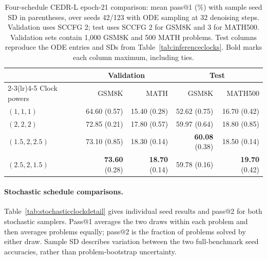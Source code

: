 \documentclass[11pt,letterpaper]{article}
\begin{document}
\begin{table}[htbp]
\centering\small
\caption{Four-schedule CEDR-L epoch-21 comparison: mean pass@1 (\%) with sample seed SD in parentheses, over seeds 42/123 with ODE sampling at 32 denoising steps. Validation uses SCCFG 2; test uses SCCFG 2 for GSM8K and 3 for MATH500. Validation sets contain 1,000 GSM8K and 500 MATH problems. Test columns reproduce the ODE entries and SDs from Table~\ref{tab:inferenceclocks}. Bold marks each column maximum, including ties.}
\label{tab:inferenceclockfull}
\begin{tabular}{lrrrr}
\toprule
& \multicolumn{2}{c}{Validation} & \multicolumn{2}{c}{Test} \\
\cmidrule(lr){2-3}\cmidrule(lr){4-5}
Clock powers & GSM8K & MATH & GSM8K & MATH500 \\
\midrule
$(1,1,1)$ & 64.60 {\scriptsize (0.57)} & 15.40 {\scriptsize (0.28)} & 52.62 {\scriptsize (0.75)} & 16.70 {\scriptsize (0.42)} \\
$(2,2,2)$ & 72.85 {\scriptsize (0.21)} & 17.80 {\scriptsize (0.57)} & 59.97 {\scriptsize (0.64)} & 18.80 {\scriptsize (0.85)} \\
$(1.5,2,2.5)$ & 73.10 {\scriptsize (0.85)} & 18.30 {\scriptsize (0.14)} & \textbf{60.08} {\scriptsize (0.38)} & 18.50 {\scriptsize (0.14)} \\
$(2.5,2,1.5)$ & \textbf{73.60} {\scriptsize (0.28)} & \textbf{18.70} {\scriptsize (0.14)} & 59.78 {\scriptsize (0.16)} & \textbf{19.70} {\scriptsize (0.42)} \\
\bottomrule
\end{tabular}
\end{table}

\paragraph{Stochastic schedule comparisons.}
Table~\ref{tab:stochasticclockdetail} gives individual seed results and pass@2 for both stochastic samplers. Pass@1 averages the two draws within each problem and then averages problems equally; pass@2 is the fraction of problems solved by either draw. Sample SD describes variation between the two full-benchmark seed accuracies, rather than problem-bootstrap uncertainty.
\end{document}
